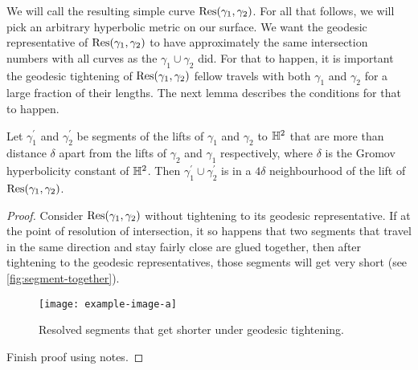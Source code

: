 \documentclass[12pt, reqno]{amsart}
\begin{document}
We will call the resulting simple curve $\mathrm{Res}(\gamma_1, \gamma_2)$.
For all that follows, we will pick an arbitrary hyperbolic metric on our surface.
We want the geodesic representative of $\mathrm{Res}(\gamma_1, \gamma_2)$ to have approximately the same intersection numbers with all curves as the $\gamma_1 \cup \gamma_2$ did.
For that to happen, it is important the geodesic tightening of $\mathrm{Res}(\gamma_1, \gamma_2)$ fellow travels with both $\gamma_1$ and $\gamma_2$ for a large fraction of their lengths.
The next lemma describes the conditions for that to happen.
\begin{lemma}
  \label{lem:geodesic-tightening}
  Let $\gamma_1^{\prime}$ and $\gamma_2^{\prime}$ be segments of the lifts of $\gamma_1$ and $\gamma_2$ to $\mathbb{H}^2$ that are more than distance $\delta$ apart from the lifts of $\gamma_2$ and $\gamma_1$ respectively, where $\delta$ is the Gromov hyperbolicity constant of $\mathbb{H}^2$.
  Then $\gamma_1^{\prime} \cup \gamma_2^{\prime}$ is in a $4 \delta$ neighbourhood of the lift of $\mathrm{Res}(\gamma_1, \gamma_2)$.
\end{lemma}
\begin{proof}
  Consider $\mathrm{Res}(\gamma_1, \gamma_2)$ without tightening to its geodesic representative.
  If at the point of resolution of intersection, it so happens that two segments that travel in the same direction and stay fairly close are glued together, then after tightening to the geodesic representatives, those segments will get very short (see \autoref{fig:segment-together}).
  \begin{figure}[h]
    \centering
    \texttt{[image: example-image-a]}
    \caption{Resolved segments that get shorter under geodesic tightening.}
    \label{fig:segment-together}
  \end{figure}
  {\color{red} Finish proof using notes.}
\end{proof}
\end{document}
